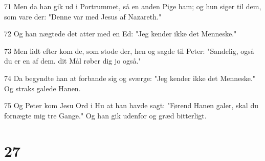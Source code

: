 \par 71 Men da han gik ud i Portrummet, så en anden Pige ham; og hun siger til dem, som vare der: "Denne var med Jesus af Nazareth."
\par 72 Og han nægtede det atter med en Ed: "Jeg kender ikke det Menneske."
\par 73 Men lidt efter kom de, som stode der, hen og sagde til Peter: "Sandelig, også du er en af dem. dit Mål røber dig jo også."
\par 74 Da begyndte han at forbande sig og sværge: "Jeg kender ikke det Menneske." Og straks galede Hanen.
\par 75 Og Peter kom Jesu Ord i Hu at han havde sagt: "Førend Hanen galer, skal du fornægte mig tre Gange." Og han gik udenfor og græd bitterligt.

\chapter{27}

